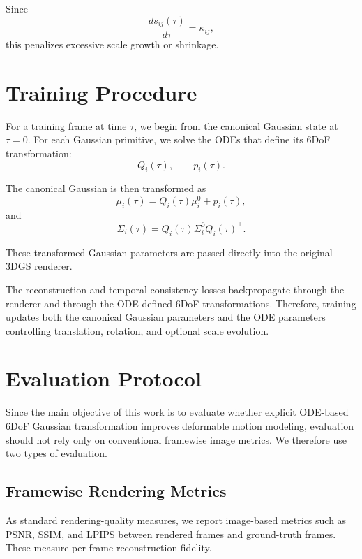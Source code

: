 \documentclass[11pt]{article}
\begin{document}
Since
\begin{equation}
\frac{d s_{ij}(\tau)}{d\tau} = \kappa_{ij},
\end{equation}
this penalizes excessive scale growth or shrinkage.

\section{Training Procedure}

For a training frame at time $\tau$, we begin from the canonical Gaussian state at $\tau=0$. For each Gaussian primitive, we solve the ODEs that define its 6DoF transformation:
\begin{equation}
Q_i(\tau),
\qquad
p_i(\tau).
\end{equation}

The canonical Gaussian is then transformed as
\begin{equation}
\mu_i(\tau) = Q_i(\tau)\mu_i^0+p_i(\tau),
\end{equation}
and
\begin{equation}
\Sigma_i(\tau) = Q_i(\tau)\Sigma_i^0Q_i(\tau)^\top.
\end{equation}

These transformed Gaussian parameters are passed directly into the original 3DGS renderer.

The reconstruction and temporal consistency losses backpropagate through the renderer and through the ODE-defined 6DoF transformations. Therefore, training updates both the canonical Gaussian parameters and the ODE parameters controlling translation, rotation, and optional scale evolution.

\section{Evaluation Protocol}

Since the main objective of this work is to evaluate whether explicit ODE-based 6DoF Gaussian transformation improves deformable motion modeling, evaluation should not rely only on conventional framewise image metrics. We therefore use two types of evaluation.

\subsection{Framewise Rendering Metrics}

As standard rendering-quality measures, we report image-based metrics such as PSNR, SSIM, and LPIPS between rendered frames and ground-truth frames. These measure per-frame reconstruction fidelity.
\end{document}
